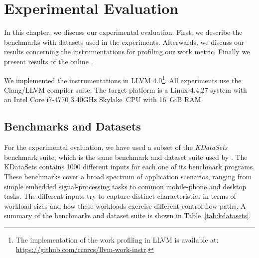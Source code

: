 
\chapter{Experimental Evaluation}\label{chap:eval}

In this chapter, we discuss our experimental evaluation.
First, we describe the benchmarks with datasets used in the experiments.
Afterwards, we discuss our results concerning the instrumentations for profiling our work metric.
Finally we present results of the online {\itercomp}.

We implemented the instrumentations in LLVM 4.0\footnote{The implementation of the work profiling in LLVM is available at: \url{https://github.com/rcorcs/llvm-work-instr}.}.
All experiments use the Clang/LLVM compiler suite.
The target platform is a Linux-4.4.27 system with an Intel Core i7-4770 3.40GHz Skylake~CPU with 16~GiB RAM.

\section{Benchmarks and Datasets} \label{sec:benchmarks}


For the experimental evaluation, we have used a subset of the \textit{KDataSets} benchmark suite, which is the same benchmark and dataset suite used by \cite{chen10,chen12a}.
The KDataSets contains 1000 different inputs for each one of its benchmark programs.
These benchmarks cover a broad spectrum of application scenarios, ranging from simple embedded signal-processing tasks to common mobile-phone and desktop tasks.
The different inputs try to capture distinct characteristics in terms of workload sizes and how these workloads exercise different control flow paths.
A summary of the benchmarks and dataset suite is shown in Table~\ref{tab:kdatasets}.

